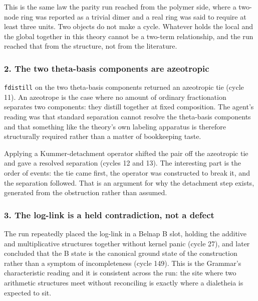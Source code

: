 This is the same law the parity run reached from the polymer side, where
a two-node ring was reported as a trivial dimer and a real ring was said
to require at least three units. Two objects do not make a cycle.
Whatever holds the local and the global together in this theory cannot
be a two-term relationship, and the run reached that from the structure,
not from the literature.

\hypertarget{the-two-theta-basis-components-are-azeotropic}{%
\subsubsection{2. The two theta-basis components are
azeotropic}\label{the-two-theta-basis-components-are-azeotropic}}

\texttt{fdistill} on the two theta-basis components returned an
azeotropic tie (cycle 11). An azeotrope is the case where no amount of
ordinary fractionation separates two components: they distill together
at fixed composition. The agent's reading was that standard separation
cannot resolve the theta-basis components and that something like the
theory's own labeling apparatus is therefore structurally required
rather than a matter of bookkeeping taste.

Applying a Kummer-detachment operator shifted the pair off the
azeotropic tie and gave a resolved separation (cycles 12 and 13). The
interesting part is the order of events: the tie came first, the
operator was constructed to break it, and the separation followed. That
is an argument for why the detachment step exists, generated from the
obstruction rather than assumed.

\hypertarget{the-log-link-is-a-held-contradiction-not-a-defect}{%
\subsubsection{3. The log-link is a held contradiction, not a
defect}\label{the-log-link-is-a-held-contradiction-not-a-defect}}

The run repeatedly placed the log-link in a Belnap B slot, holding the
additive and multiplicative structures together without kernel panic
(cycle 27), and later concluded that the B state is the canonical ground
state of the construction rather than a symptom of incompleteness (cycle
149). This is the Grammar's characteristic reading and it is consistent
across the run: the site where two arithmetic structures meet without
reconciling is exactly where a dialetheia is expected to sit.

